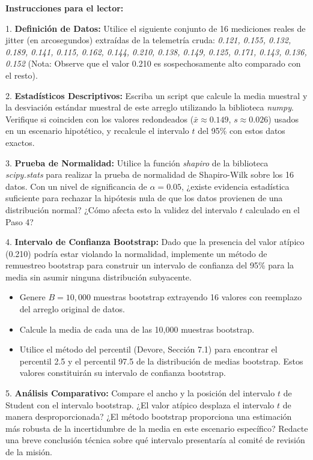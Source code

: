 \textbf{Instrucciones para el lector:}

1. \textbf{Definición de Datos:} Utilice el siguiente conjunto de 16 mediciones reales de jitter (en arcosegundos) extraídas de la telemetría cruda:
   \textit{0.121, 0.155, 0.132, 0.189, 0.141, 0.115, 0.162, 0.144, 0.210, 0.138, 0.149, 0.125, 0.171, 0.143, 0.136, 0.152}
   (Nota: Observe que el valor 0.210 es sospechosamente alto comparado con el resto).

2. \textbf{Estadísticos Descriptivos:} Escriba un script que calcule la media muestral y la desviación estándar muestral de este arreglo utilizando la biblioteca \textit{numpy}. Verifique si coinciden con los valores redondeados ($\bar{x} \approx 0.149$, $s \approx 0.026$) usados en un escenario hipotético, y recalcule el intervalo $t$ del 95\% con estos datos exactos.

3. \textbf{Prueba de Normalidad:} Utilice la función \textit{shapiro} de la biblioteca \textit{scipy.stats} para realizar la prueba de normalidad de Shapiro-Wilk sobre los 16 datos. Con un nivel de significancia de $\alpha = 0.05$, ¿existe evidencia estadística suficiente para rechazar la hipótesis nula de que los datos provienen de una distribución normal? ¿Cómo afecta esto la validez del intervalo $t$ calculado en el Paso 4?

4. \textbf{Intervalo de Confianza Bootstrap:} Dado que la presencia del valor atípico (0.210) podría estar violando la normalidad, implemente un método de remuestreo bootstrap para construir un intervalo de confianza del 95\% para la media sin asumir ninguna distribución subyacente.
   \begin{itemize}
       \item Genere $B = 10,000$ muestras bootstrap extrayendo 16 valores con reemplazo del arreglo original de datos.
       \item Calcule la media de cada una de las 10,000 muestras bootstrap.
       \item Utilice el método del percentil (Devore, Sección 7.1) para encontrar el percentil 2.5 y el percentil 97.5 de la distribución de medias bootstrap. Estos valores constituirán su intervalo de confianza bootstrap.
   \end{itemize}

5. \textbf{Análisis Comparativo:} Compare el ancho y la posición del intervalo $t$ de Student con el intervalo bootstrap. ¿El valor atípico desplaza el intervalo $t$ de manera desproporcionada? ¿El método bootstrap proporciona una estimación más robusta de la incertidumbre de la media en este escenario específico? Redacte una breve conclusión técnica sobre qué intervalo presentaría al comité de revisión de la misión.